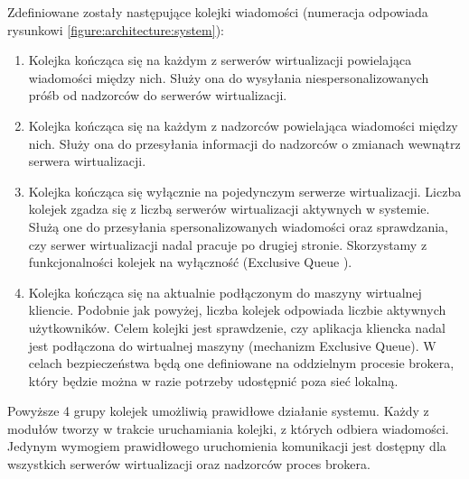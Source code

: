 \documentclass[../opis-rozwiazania.tex]{subfiles}
\begin{document}
Zdefiniowane zostały następujące kolejki wiadomości (numeracja odpowiada rysunkowi \ref{figure:architecture:system}):
\begin{enumerate}[label=(\Roman*)]
      \item \label{modules:broker:queue-virtsrv} Kolejka kończąca się na każdym z serwerów wirtualizacji powielająca wiadomości między nich.
            Służy ona do wysyłania niespersonalizowanych próśb od nadzorców do serwerów wirtualizacji.
      \item \label{modules:broker:queue-overseers} Kolejka kończąca się na każdym z nadzorców powielająca wiadomości między nich.
            Służy ona do przesyłania informacji do nadzorców o zmianach wewnątrz serwera wirtualizacji.
      \item \label{modules:broker:queue-exclusive} Kolejka kończąca się wyłącznie na pojedynczym serwerze wirtualizacji.
            Liczba kolejek zgadza się z liczbą serwerów wirtualizacji aktywnych w systemie.
            Służą one do przesyłania spersonalizowanych wiadomości oraz sprawdzania, czy serwer wirtualizacji nadal pracuje po drugiej stronie.
            Skorzystamy z funkcjonalności kolejek na wyłączność (Exclusive Queue \parencite{xrdp-clients}).
      \item \label{modules:broker:queue-users} Kolejka kończąca się na aktualnie podłączonym do maszyny wirtualnej kliencie.
            Podobnie jak powyżej, liczba kolejek odpowiada liczbie aktywnych użytkowników.
            Celem kolejki jest sprawdzenie, czy aplikacja kliencka nadal jest podłączona do wirtualnej maszyny (mechanizm Exclusive Queue).
            W celach bezpieczeństwa będą one definiowane na oddzielnym procesie brokera, który będzie można w razie potrzeby udostępnić poza sieć lokalną.
\end{enumerate}

Powyższe 4 grupy kolejek umożliwią prawidłowe działanie systemu.
Każdy z modułów tworzy w trakcie uruchamiania kolejki, z których odbiera wiadomości.
Jedynym wymogiem prawidłowego uruchomienia komunikacji jest dostępny dla wszystkich serwerów wirtualizacji oraz nadzorców proces brokera.
\end{document}

